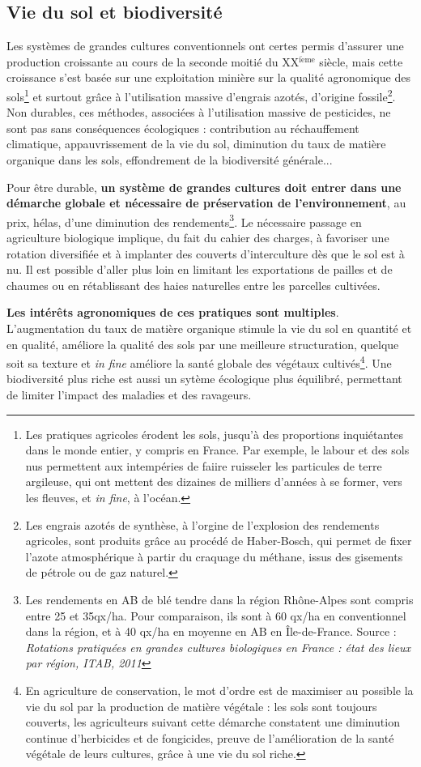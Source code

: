 \documentclass{book}
\begin{document}
\subsection{Vie du sol et biodiversité}

Les systèmes de grandes cultures conventionnels ont certes permis d'assurer une production croissante au cours de la seconde moitié du XX$^{\mathrm{i\grave{e}me}}$ siècle, mais cette croissance s'est basée sur une exploitation minière sur la qualité agronomique des sols\footnote{Les pratiques agricoles érodent les sols, jusqu'à des proportions inquiétantes dans le monde entier, y compris en France. Par exemple, le labour et des sols nus permettent aux intempéries de faiire ruisseler les particules de terre argileuse, qui ont mettent des dizaines de milliers d'années à se former, vers les fleuves, et \textit{in fine}, à l'océan.} et surtout grâce à l'utilisation massive d'engrais azotés, d'origine fossile\footnote{Les engrais azotés de synthèse, à l'orgine de l'explosion des rendements agricoles, sont produits grâce au procédé de Haber-Bosch, qui permet de fixer l'azote atmosphérique à partir du craquage du méthane, issus des gisements de pétrole ou de gaz naturel.}. Non durables, ces méthodes, associées à l'utilisation massive de pesticides, ne sont pas sans conséquences écologiques : contribution au réchauffement climatique, appauvrissement de la vie du sol, diminution du taux de matière organique dans les sols, effondrement de la biodiversité générale...

Pour être durable, \textbf{un système de grandes cultures doit entrer dans une démarche globale et nécessaire de préservation de l'environnement}, au prix, hélas, d'une diminution des rendements\footnote{Les rendements en AB de blé tendre dans la région Rhône-Alpes sont compris entre 25 et 35qx/ha. Pour comparaison, ils sont à 60 qx/ha en conventionnel dans la région, et à 40 qx/ha en moyenne en AB en Île-de-France. Source : \textit{Rotations pratiquées en grandes cultures biologiques en France : état des lieux par région, ITAB, 2011}}. Le nécessaire passage en agriculture biologique implique, du fait du cahier des charges, à favoriser une rotation diversifiée et à implanter des couverts d'interculture dès que le sol est à nu. Il est possible d'aller plus loin en limitant les exportations de pailles et de chaumes ou en rétablissant des haies naturelles entre les parcelles cultivées.

\textbf{Les intérêts agronomiques de ces pratiques sont multiples}. L'augmentation du taux de matière organique stimule la vie du sol en quantité et en qualité, améliore la qualité des sols par une meilleure structuration, quelque soit sa texture et \textit{in fine} améliore la santé globale des végétaux cultivés\footnote{En agriculture de conservation, le mot d'ordre est de maximiser au possible la vie du sol par la production de matière végétale : les sols sont toujours couverts, les agriculteurs suivant cette démarche constatent une diminution continue d'herbicides et de fongicides, preuve de l'amélioration de la santé végétale de leurs cultures, grâce à une vie du sol riche.}. Une biodiversité plus riche est aussi un sytème écologique plus équilibré, permettant de limiter l'impact des maladies et des ravageurs.
\end{document}
